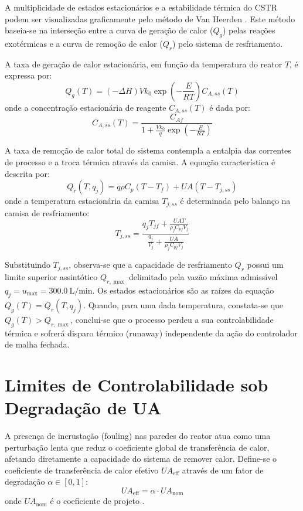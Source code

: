 A multiplicidade de estados estacionários e a estabilidade térmica do CSTR podem ser visualizadas graficamente pelo método de Van Heerden \cite{VanHeerden1953, Uppal1974}. Este método baseia-se na interseção entre a curva de geração de calor ($Q_g$) pelas reações exotérmicas e a curva de remoção de calor ($Q_r$) pelo sistema de resfriamento.

A taxa de geração de calor estacionária, em função da temperatura do reator $T$, é expressa por:
\begin{equation}
    Q_g(T) = (-\Delta H) V k_0 \exp\left(-\frac{E}{RT}\right) C_{A,ss}(T)
\end{equation}
onde a concentração estacionária de reagente $C_{A,ss}(T)$ é dada por:
\begin{equation}
    C_{A,ss}(T) = \frac{C_{Af}}{1 + \frac{V k_0}{q} \exp\left(-\frac{E}{RT}\right)}
\end{equation}

A taxa de remoção de calor total do sistema contempla a entalpia das correntes de processo e a troca térmica através da camisa. A equação característica é descrita por:
\begin{equation}
    Q_r(T, q_j) = q \rho C_p (T - T_f) + UA(T - T_{j,ss})
\end{equation}
onde a temperatura estacionária da camisa $T_{j,ss}$ é determinada pelo balanço na camisa de resfriamento:
\begin{equation}
    T_{j,ss} = \frac{q_j T_{jf} + \frac{UA T}{\rho_j C_{pj} V_j}}{\frac{q_j}{V_j} + \frac{UA}{\rho_j C_{pj} V_j}}
\end{equation}

Substituindo $T_{j,ss}$, observa-se que a capacidade de resfriamento $Q_r$ possui um limite superior assintótico $Q_{r,\max}$ delimitado pela vazão máxima admissível $q_j = u_{\max} = \SI{300.0}{\liter\per\minute}$. Os estados estacionários são as raízes da equação $Q_g(T) = Q_r(T, q_j)$. Quando, para uma dada temperatura, constata-se que $Q_g(T) > Q_{r,\max}$, conclui-se que o processo perdeu a sua controlabilidade térmica e sofrerá disparo térmico (runaway) independente da ação do controlador de malha fechada.

\section{Limites de Controlabilidade sob Degradação de UA}
\label{sec:degradacao_ua}

A presença de incrustação (fouling) nas paredes do reator atua como uma perturbação lenta que reduz o coeficiente global de transferência de calor, afetando diretamente a capacidade do sistema de remover calor. Define-se o coeficiente de transferência de calor efetivo $UA_{\text{eff}}$ através de um fator de degradação $\alpha \in [0, 1]$:
\begin{equation}
    UA_{\text{eff}} = \alpha \cdot UA_{\text{nom}}
\end{equation}
onde $UA_{\text{nom}}$ é o coeficiente de projeto \cite{Russo2008}. 

